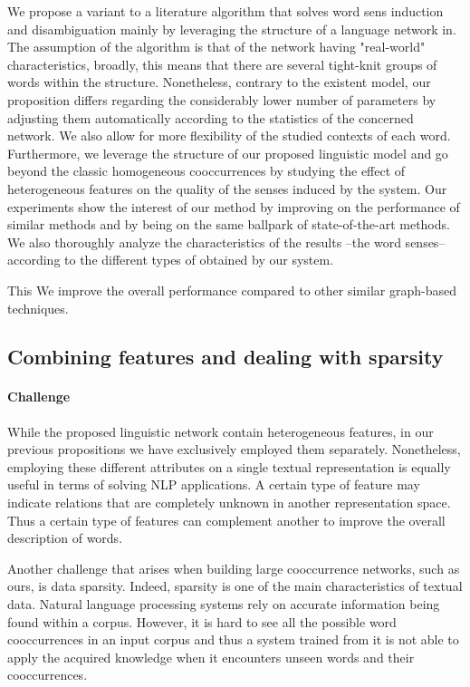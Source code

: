 We propose a variant to a literature algorithm that solves word sens induction and disambiguation mainly by leveraging  the structure of a language network in. The assumption of the algorithm is that of the network having "real-world" characteristics, broadly, this means that there are several tight-knit groups of words within the structure. Nonetheless, contrary to the existent model, our proposition differs regarding the considerably lower number of parameters by adjusting them automatically according to the statistics of the concerned network. We also allow for more flexibility of the studied contexts of each word. Furthermore, we leverage the structure of our proposed linguistic model and go beyond the classic homogeneous cooccurrences by studying the effect of heterogeneous features on the quality of the senses induced by the system. Our experiments show the interest of our method by improving on the performance of similar methods and by being on the same ballpark of state-of-the-art methods. We also thoroughly analyze the characteristics of the results --the word senses-- according to the different types of  obtained by our system.

 This We  improve the overall performance compared to other similar graph-based techniques.

\subsection{Combining features and dealing with sparsity}
\paragraph{Challenge}

While the proposed linguistic network contain heterogeneous features, in our previous propositions we have exclusively employed them separately. Nonetheless, employing these different attributes on a single textual representation is equally useful in terms of solving NLP applications. A certain type of feature may indicate relations that are completely unknown in another representation space. Thus a certain type of features can complement another to improve the overall description of words.

Another challenge that arises when building large cooccurrence networks, such as ours, is data sparsity. Indeed, sparsity is one of the main characteristics of textual data. Natural language processing systems rely on accurate information being found within a corpus. However, it is hard to see all the possible word cooccurrences in an input corpus and thus a system trained from it is not able to apply the acquired knowledge when it encounters unseen words and their cooccurrences.


